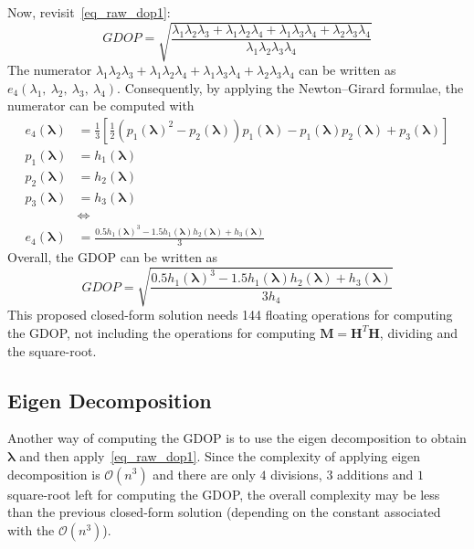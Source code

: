 \documentclass[a4paper]{report}
\begin{document}
Now, revisit~\eqref{eq_raw_dop1}:
\begin{equation}
GDOP = \sqrt{\frac{\lambda_1\lambda_2\lambda_3+\lambda_1\lambda_2\lambda_4+\lambda_1\lambda_3\lambda_4+\lambda_2\lambda_3\lambda_4}{\lambda_1\lambda_2\lambda_3\lambda_4}}
\end{equation}
The numerator $\lambda_1\lambda_2\lambda_3+\lambda_1\lambda_2\lambda_4+\lambda_1\lambda_3\lambda_4+\lambda_2\lambda_3\lambda_4$ can be written as $e_4(\lambda_1,\ \lambda_2,\ \lambda_3,\ \lambda_4)$. Consequently, by applying the Newton–Girard formulae, the numerator can be computed with
\begin{align}
e_4(\mathbf{\lambda})&=\frac{1}{3}\left[ 
\frac{1}{2}\left(p_1(\mathbf{\lambda})^2-p_2(\mathbf{\lambda})\right)p_1(\mathbf{\lambda})-p_1(\mathbf{\lambda})p_2(\mathbf{\lambda})+p_3(\mathbf{\lambda})
\right] \\
p_1(\mathbf{\lambda})&=h_1(\mathbf{\lambda}) \\
p_2(\mathbf{\lambda})&=h_2(\mathbf{\lambda}) \\
p_3(\mathbf{\lambda})&=h_3(\mathbf{\lambda}) \\
&\Leftrightarrow \nonumber \\
e_4(\mathbf{\lambda})&=\frac{0.5h_1(\mathbf{\lambda})^3-1.5h_1(\mathbf{\lambda})h_2(\mathbf{\lambda})+h_3(\mathbf{\lambda})}{3}
\end{align}
Overall, the GDOP can be written as
\begin{equation}
GDOP = \sqrt{\frac{0.5h_1(\mathbf{\lambda})^3-1.5h_1(\mathbf{\lambda})h_2(\mathbf{\lambda})+h_3(\mathbf{\lambda})}{3h_4}}
\end{equation}
This proposed closed-form solution needs 144 floating operations for computing the GDOP, not including the operations for computing $\mathbf{M}=\mathbf{H}^T\mathbf{H}$, dividing and the square-root.
\subsection{Eigen Decomposition}
Another way of computing the GDOP is to use the eigen decomposition to obtain $\mathbf{\lambda}$ and then apply~\ref{eq_raw_dop1}. Since the complexity of applying eigen decomposition is $\mathcal{O}(n^3)$ and there are only $4$ divisions, $3$ additions and $1$ square-root left for computing the GDOP, the overall complexity may be less than the previous closed-form solution (depending on the constant associated with the $\mathcal{O}(n^3)$).
\end{document}
